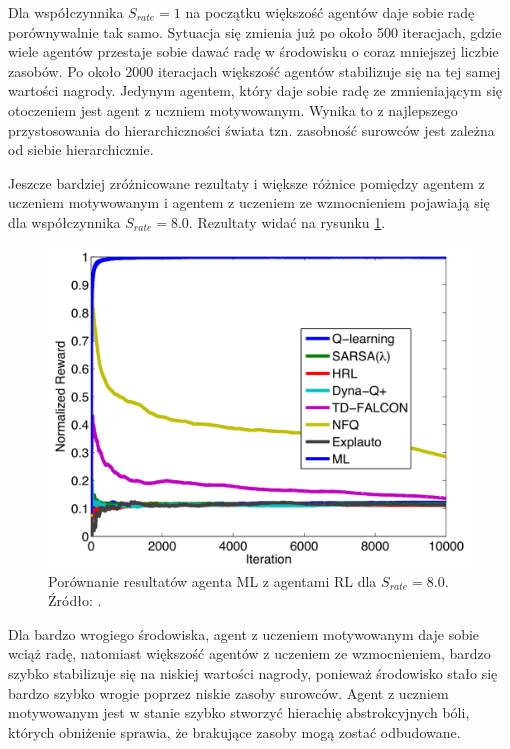 Dla współczynnika $S_{rate}=1$ na początku większość agentów daje sobie radę 
porównywalnie tak samo. Sytuacja się zmienia już po około 500 iteracjach, 
gdzie wiele agentów przestaje sobie dawać radę w środowisku o coraz mniejszej
liczbie zasobów. Po około 2000 iteracjach większość agentów stabilizuje się
na tej samej wartości nagrody. Jedynym agentem, który daje sobie radę ze
zmnieniającym się otoczeniem jest agent z uczniem motywowanym. Wynika to
z najlepszego przystosowania do hierarchiczności świata tzn. zasobność 
surowców jest zależna od siebie hierarchicznie.  

Jeszcze bardziej zróżnicowane rezultaty i większe różnice pomiędzy agentem
z uczeniem motywowanym i agentem z uczeniem ze wzmocnieniem pojawiają
się dla współczynnika $S_{rate}=8.0$. Rezultaty widać na rysunku \ref{fig:ml_vs_rl_blackbox_srate8}.

\begin{figure}[h]
    \centering
    \includegraphics[width=0.6\linewidth]{rozdzial4/images/ml_vs_rl_blackbox_srate_8}
    \caption{Porównanie resultatów agenta ML z agentami RL dla $S_{rate}=8.0$. 
    Źródło: \cite{ml_vs_rl_comparative_study}.}
    \label{fig:ml_vs_rl_blackbox_srate8}
\end{figure}

Dla bardzo wrogiego środowiska, agent z uczeniem motywowanym daje sobie wciąż
radę, natomiast większość agentów z uczeniem ze wzmocnieniem, bardzo szybko 
stabilizuje się na niskiej wartości nagrody, ponieważ środowisko stało się
bardzo szybko wrogie poprzez niskie zasoby surowców. Agent z uczniem
motywowanym jest w stanie szybko stworzyć hierachię abstrokcyjnych bóli,
których obniżenie sprawia, że brakujące zasoby mogą zostać odbudowane.

